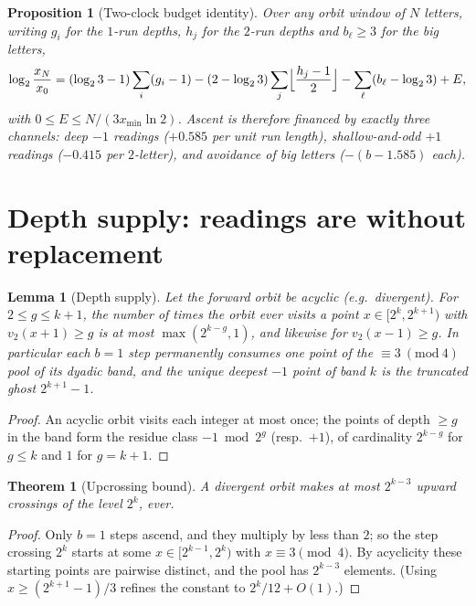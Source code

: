 \documentclass[11pt]{article}
\newtheorem{theorem}{Theorem}
\newtheorem{lemma}{Lemma}
\newtheorem{proposition}{Proposition}
\newcommand{\vt}{v_2}
\begin{document}
\begin{proposition}[Two-clock budget identity]\label{prop:budget}
Over any orbit window of $N$ letters, writing $g_i$ for the $1$-run
depths, $h_j$ for the $2$-run depths and $b_\ell\ge3$ for the big
letters,
\[
\log_2\frac{x_N}{x_0}
=(\log_23-1)\sum_i(g_i-1)
-(2-\log_23)\sum_j\Bigl\lfloor\frac{h_j-1}{2}\Bigr\rfloor
-\sum_\ell(b_\ell-\log_23)
+E,
\]
with $0\le E\le N/(3x_{\min}\ln2)$. Ascent is therefore financed by
exactly three channels: deep $-1$ readings ($+0.585$ per unit run
length), shallow-and-odd $+1$ readings ($-0.415$ per $2$-letter), and
avoidance of big letters ($-(b-1.585)$ each).
\end{proposition}

\section{Depth supply: readings are without replacement}

\begin{lemma}[Depth supply]\label{lem:supply}
Let the forward orbit be acyclic (e.g.\ divergent). For $2\le g\le k+1$,
the number of times the orbit \emph{ever} visits a point
$x\in[2^k,2^{k+1})$ with $\vt(x+1)\ge g$ is at most
$\max(2^{k-g},1)$, and likewise for $\vt(x-1)\ge g$. In particular each
$b{=}1$ step permanently consumes one point of the
$\equiv3\ (\mathrm{mod}\ 4)$ pool of its dyadic band, and the unique
deepest $-1$ point of band $k$ is the truncated ghost $2^{k+1}-1$.
\end{lemma}

\begin{proof}
An acyclic orbit visits each integer at most once; the points of depth
$\ge g$ in the band form the residue class $-1 \bmod 2^g$ (resp.\
$+1$), of cardinality $2^{k-g}$ for $g\le k$ and $1$ for $g=k+1$.
\end{proof}

\begin{theorem}[Upcrossing bound]\label{thm:upcross}
A divergent orbit makes at most $2^{k-3}$ upward crossings of the level
$2^k$, ever.
\end{theorem}

\begin{proof}
Only $b{=}1$ steps ascend, and they multiply by less than $2$; so the
step crossing $2^k$ starts at some $x\in[2^{k-1},2^k)$ with
$x\equiv3\pmod4$. By acyclicity these starting points are pairwise
distinct, and the pool has $2^{k-3}$ elements. (Using
$x\ge(2^{k+1}-1)/3$ refines the constant to $2^k/12+O(1)$.)
\end{proof}
\end{document}
